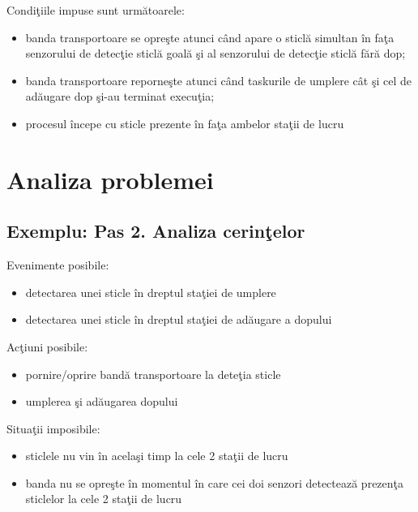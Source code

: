\documentclass[a4paper, 11pt]{article}
\begin{document}
 \begin{flushleft}
Condi\c{t}iile impuse sunt urm\u{a}toarele:
\end{flushleft}

\begin{itemize}
\item banda transportoare se opre\c{s}te atunci c\^{a}nd apare o sticl\u{a} simultan \^{i}n fa\c{t}a senzorului de detec\c{t}ie sticl\u{a} goal\u{a} \c{s}i al senzorului de detec\c{t}ie sticl\u{a} f\u{a}r\u{a} dop;
\item banda transportoare reporne\c{s}te atunci c\^{a}nd taskurile de umplere c\^{a}t \c{s}i cel de ad\u{a}ugare dop \c{s}i-au terminat execu\c{t}ia;
\item procesul \^{i}ncepe cu sticle prezente \^{i}n fa\c{t}a ambelor sta\c{t}ii de lucru
\end{itemize}


\newpage 

\section{Analiza problemei}


\subsection{Exemplu: Pas 2. Analiza cerin\c{t}elor} 

Evenimente posibile:
\begin{itemize}
    \item detectarea unei sticle \^{i}n dreptul sta\c{t}iei de umplere
    \item detectarea unei sticle \^{i}n dreptul sta\c{t}iei de ad\u{a}ugare a dopului
\end{itemize}

\begin{flushleft}
Ac\c{t}iuni posibile:
\end{flushleft}
\begin{itemize}
    \item pornire/oprire band\u{a} transportoare la dete\c{t}ia sticle
    \item umplerea \c{s}i ad\u{a}ugarea dopului
\end{itemize}



\begin{flushleft}
Situa\c{t}ii imposibile:
\end{flushleft}
\begin{itemize}
\item sticlele nu vin \^{i}n acela\c{s}i timp la cele 2 sta\c{t}ii de lucru
\item banda nu se opre\c{s}te \^{i}n momentul \^{i}n care cei doi senzori detecteaz\u{a} prezen\c{t}a sticlelor la cele 2 sta\c{t}ii de lucru
\end{itemize}
\end{document}
